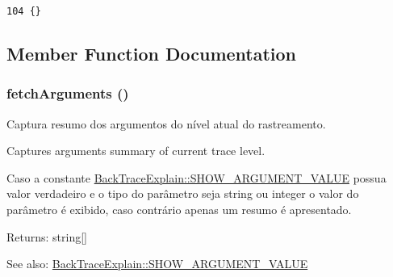 \begin{Code}\begin{verbatim}104 {}
\end{verbatim}
\end{Code}




\subsection{Member Function Documentation}
\hypertarget{class_back_trace_explain_41bebe0f7ba60f78673c97ea6f223a95}{
\subsubsection[{fetchArguments}]{\setlength{\rightskip}{0pt plus 5cm}fetchArguments ()}}
\label{class_back_trace_explain_41bebe0f7ba60f78673c97ea6f223a95}


Captura resumo dos argumentos do nível atual do rastreamento.

Captures arguments summary of current trace level.

Caso a constante \hyperlink{class_back_trace_explain_51d167de814dda92b83aa6518e396fc3}{BackTraceExplain::SHOW\_\-ARGUMENT\_\-VALUE} possua valor verdadeiro e o tipo do parâmetro seja string ou integer o valor do parâmetro é exibido, caso contrário apenas um resumo é apresentado.

\begin{Desc}
\item[Returns:]string\mbox{[}\mbox{]} \end{Desc}
\begin{Desc}
\item[See also:]\hyperlink{class_back_trace_explain_51d167de814dda92b83aa6518e396fc3}{BackTraceExplain::SHOW\_\-ARGUMENT\_\-VALUE} \end{Desc}


